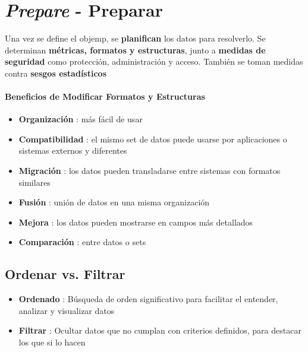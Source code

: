 \section{\textit{Prepare} - Preparar}
Una vez se define el \gls{objemp}, se \textbf{planifican} los datos para resolverlo. Se determinan \textbf{métricas, formatos y estructuras}, junto a \textbf{medidas de seguridad} como protección, administración y acceso. También se toman medidas contra \textbf{sesgos estadísticos}

\paragraph{Beneficios de Modificar Formatos y Estructuras}
\begin{itemize}
    \item {\textbf{Organización} : más fácil de usar}
    \item {\textbf{Compatibilidad} : el mismo set de datos puede usarse por aplicaciones o sistemas externos y diferentes}
    \item {\textbf{Migración} : los datos pueden transladarse entre sistemas con formatos similares}
    \item {\textbf{Fusión} : unión de datos en una misma organización}
    \item {\textbf{Mejora} : los datos pueden mostrarse en campos más detallados}
    \item {\textbf{Comparación} : entre datos o sets}
\end{itemize}

\subsection{Ordenar vs. Filtrar}
\begin{itemize}
    \item {\textbf{Ordenado} : Búsqueda de orden significativo para facilitar el entender, analizar y visualizar datos}
    \item {\textbf{Filtrar} : Ocultar datos que no cumplan con criterios definidos, para destacar los que si lo hacen}
\end{itemize}

